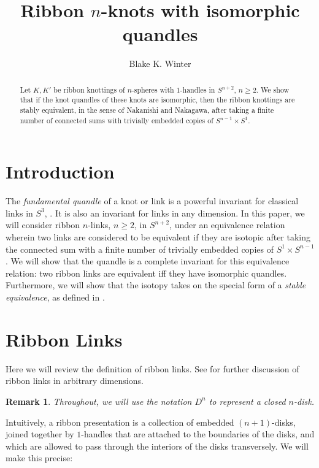 \documentclass{amsart}
\title{Ribbon $n$-knots with isomorphic quandles}
\author{Blake K. Winter}
\date{}
\newtheorem{remark}[theorem]{Remark}
\begin{document}
\thispagestyle{empty}

\begin{abstract}
Let $K, K'$ be ribbon knottings of $n$-spheres with $1$-handles in $S^{n+2}$, $n\geq 2$. We show that if the knot quandles of these knots are isomorphic, then the ribbon knottings are stably equivalent, in the sense of Nakanishi and Nakagawa, after taking a finite number of connected sums with trivially embedded copies of $S^{n-1}\times S^{1}$.
\end{abstract}

\maketitle

%
\section{Introduction}
%

The \emph{fundamental quandle} of a knot or link is a powerful invariant for classical links in $S^3$, \cite{DJ, Mat}. It is also an invariant for links in any dimension. In this paper, we will consider ribbon $n$-links, $n \geq 2$, in $S^{n+2}$, under an equivalence relation wherein two links are considered to be equivalent if they are isotopic after taking the connected sum with a finite number of trivially embedded copies of $S^1 \times S^{n-1}$. We will show that the quandle is a complete invariant for this equivalence relation: two ribbon links are equivalent iff they have isomorphic quandles. Furthermore, we will show that the isotopy takes on the special form of a \emph{stable equivalence}, as defined in \cite{Naka, NakaNaka}.

\section{Ribbon Links}


Here we will review the definition of ribbon links. See \cite{CKS, Naka, NakaNaka} for further discussion of ribbon links in arbitrary dimensions.

\begin{remark}
Throughout, we will use the notation $D^n$ to represent a closed $n$-disk.
\end{remark}

Intuitively, a ribbon presentation is a collection of embedded $(n+1)$-disks, joined together by $1$-handles that are attached to the boundaries of the disks, and which are allowed to pass through the interiors of the disks transversely. We will make this precise: 
\end{document}
